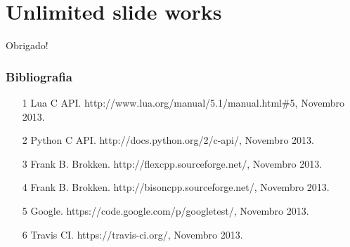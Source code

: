\documentclass[brazil]{beamer}
\begin{document}
\section{Unlimited slide works}
\begin{frame}
  \begin{center}
    \LARGE Obrigado!
  \end{center}
\end{frame}
\begin{frame}
  \frametitle{Bibliografia}
  \begin{itemize}
    \footnotesize
    \item[1]
      Lua C API. http://www.lua.org/manual/5.1/manual.html\#5, Novembro 2013.
    \vspace{1em}
    \item[2]
      Python C API. http://docs.python.org/2/c-api/, Novembro 2013.
    \vspace{1em}
    \item[3]
      Frank B. Brokken. http://flexcpp.sourceforge.net/, Novembro 2013.
    \vspace{1em}
    \item[4]
      Frank B. Brokken. http://bisoncpp.sourceforge.net/, Novembro 2013.
    \vspace{1em}
    \item[5]
      Google. https://code.google.com/p/googletest/, Novembro 2013.
    \vspace{1em}
    \item[6]
      Travis CI. https://travis-ci.org/, Novembro 2013.
  \end{itemize}
\end{frame}
\end{document}
